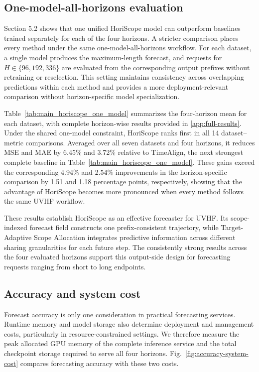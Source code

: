 \subsection{One-model-all-horizons evaluation}
\label{sec:one-model-comparison}


Section 5.2 shows that one unified HoriScope model can outperform baselines trained separately for each of the four horizons. A stricter comparison places every method under the same one-model-all-horizons workflow. For each dataset, a single model produces the maximum-length forecast, and requests for $H\in\{96,192,336\}$ are evaluated from the corresponding output prefixes without retraining or reselection. This setting maintains consistency across overlapping predictions within each method and provides a more deployment-relevant comparison without horizon-specific model specialization.




Table~\ref{tab:main_horiscope_one_model} summarizes the four-horizon mean for each dataset, with complete horizon-wise results provided in \ref{app:full-results}. Under the shared one-model constraint, HoriScope ranks first in all 14 dataset--metric comparisons. Averaged over all seven datasets and four horizons, it reduces MSE and MAE by 6.45\% and 3.72\% relative to TimeAlign, the next strongest complete baseline in Table~\ref{tab:main_horiscope_one_model}. These gains exceed the corresponding 4.94\% and 2.54\% improvements in the horizon-specific comparison by 1.51 and 1.18 percentage points, respectively, showing that the advantage of HoriScope becomes more pronounced when every method follows the same UVHF workflow.

These results establish HoriScope as an effective forecaster for UVHF. Its scope-indexed forecast field constructs one prefix-consistent trajectory, while Target-Adaptive Scope Allocation integrates predictive information across different sharing granularities for each future step. The consistently strong results across the four evaluated horizons support this output-side design for forecasting requests ranging from short to long endpoints.

\subsection{Accuracy and system cost}
\label{sec:system-cost}


Forecast accuracy is only one consideration in practical forecasting services. Runtime memory and model storage also determine deployment and management costs, particularly in resource-constrained settings. We therefore measure the peak allocated GPU memory of the complete inference service and the total checkpoint storage required to serve all four horizons. Fig.~\ref{fig:accuracy-system-cost} compares forecasting accuracy with these two costs.



